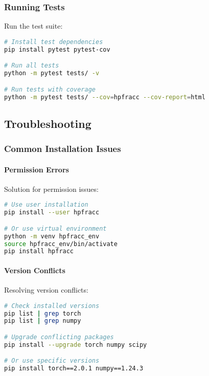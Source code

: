\subsubsection{Running Tests}

Run the test suite:

\begin{lstlisting}[language=bash, caption=Running Tests]
# Install test dependencies
pip install pytest pytest-cov

# Run all tests
python -m pytest tests/ -v

# Run tests with coverage
python -m pytest tests/ --cov=hpfracc --cov-report=html
\end{lstlisting}

\subsection{Troubleshooting}

\subsubsection{Common Installation Issues}

\paragraph{Permission Errors}
Solution for permission issues:

\begin{lstlisting}[language=bash, caption=Permission Fix]
# Use user installation
pip install --user hpfracc

# Or use virtual environment
python -m venv hpfracc_env
source hpfracc_env/bin/activate
pip install hpfracc
\end{lstlisting}

\paragraph{Version Conflicts}
Resolving version conflicts:

\begin{lstlisting}[language=bash, caption=Version Conflict Resolution]
# Check installed versions
pip list | grep torch
pip list | grep numpy

# Upgrade conflicting packages
pip install --upgrade torch numpy scipy

# Or use specific versions
pip install torch==2.0.1 numpy==1.24.3
\end{lstlisting}

